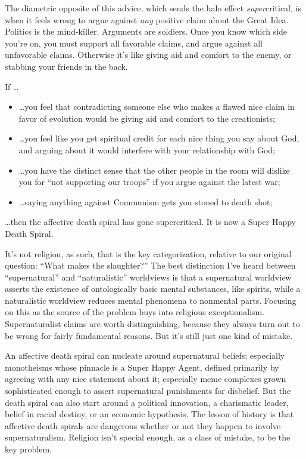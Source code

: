 {
 The diametric opposite of this advice, which sends the halo effect
\textit{super}critical, is when it feels wrong to argue against
\textit{any} positive claim about the Great Idea. Politics is the
mind-killer. Arguments are soldiers. Once you know which side
you're on, you must support all favorable claims, and
argue against all unfavorable claims. Otherwise it's
like giving aid and comfort to the enemy, or stabbing your friends in
the back.}

{
 If \ldots}

\begin{itemize}
\item {
 \ldots you feel that contradicting someone else who makes a flawed
nice claim in favor of evolution would be giving aid and comfort to the
creationists;}

\item {
 \ldots you feel like you get spiritual credit for each nice thing
you say about God, and arguing about it would interfere with your
relationship with God;}

\item {
 \ldots you have the distinct sense that the other people in the
room will dislike you for ``not supporting our
troops'' if you argue against the latest war;}

\item {
 \ldots saying anything against Communism gets you stoned to death
shot;} %
\end{itemize}

{
 \ldots then the affective death spiral has gone supercritical. It
is now a Super Happy Death Spiral.}

{
 It's not religion, as such, that is the key
categorization, relative to our original question:
``What makes the slaughter?'' The
best distinction I've heard between
``supernatural'' and
``naturalistic'' worldviews is that
a supernatural worldview asserts the existence of ontologically basic
mental substances, like spirits, while a naturalistic worldview reduces
mental phenomena to nonmental parts. Focusing on this as the source of
the problem buys into religious exceptionalism. Supernaturalist claims
are worth distinguishing, because they always turn out to be wrong for
fairly fundamental reasons. But it's still just one
kind of mistake.}

{
 An affective death spiral can nucleate around supernatural
beliefs; especially monotheisms whose pinnacle is a Super Happy Agent,
defined primarily by agreeing with any nice statement about it;
especially meme complexes grown sophisticated enough to assert
supernatural punishments for disbelief. But the death spiral can also
start around a political innovation, a charismatic leader, belief in
racial destiny, or an economic hypothesis. The lesson of history is
that affective death spirals are dangerous whether or not they happen
to involve supernaturalism. Religion isn't special
enough, as a class of mistake, to be the key problem.}


